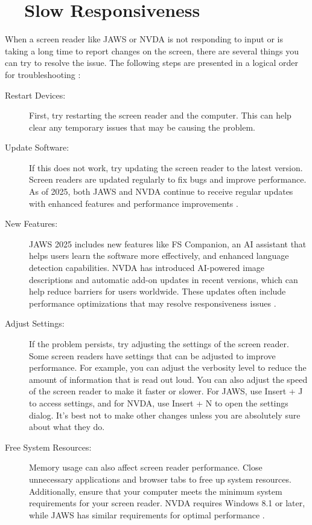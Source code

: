 \section{~~Slow Responsiveness}
\label{app1:response}
When a screen reader like JAWS or NVDA is not responding to input or is taking a long time to report changes on the screen, there are several things you can try to resolve the issue. The following steps are presented in a logical order for troubleshooting \cite{Fowler2011ScreenReaderLatency, Smith2022}:

\begin{description}
	\item[Restart Devices:] First, try restarting the screen reader and the computer. This can help clear any temporary issues that may be causing the problem.
	\item[Update Software:] If this does not work, try updating the screen reader to the latest version. Screen readers are updated regularly to fix bugs and improve performance. As of 2025, both JAWS and NVDA continue to receive regular updates with enhanced features and performance improvements \cite{JAWSWhatsNew, turn0search9}.
	\item[New Features:] JAWS 2025 includes new features like FS Companion, an AI assistant that helps users learn the software more effectively, and enhanced language detection capabilities. NVDA has introduced AI-powered image descriptions and automatic add-on updates in recent versions, which can help reduce barriers for users worldwide. These updates often include performance optimizations that may resolve responsiveness issues \cite{JAWSAILabeler, NarratorImageDescriptions}.
	\item[Adjust Settings:] If the problem persists, try adjusting the settings of the screen reader. Some screen readers have settings that can be adjusted to improve performance. For example, you can adjust the verbosity level to reduce the amount of information that is read out loud. You can also adjust the speed of the screen reader to make it faster or slower. For JAWS, use Insert + J to access settings, and for NVDA, use Insert + N to open the settings dialog. It's best not to make other changes unless you are absolutely sure about what they do.
	\item[Free System Resources:] Memory usage can also affect screen reader performance. Close unnecessary applications and browser tabs to free up system resources. Additionally, ensure that your computer meets the minimum system requirements for your screen reader. NVDA requires Windows 8.1 or later, while JAWS has similar requirements for optimal performance \cite{NVDARequirements, JAWSRequirements}.

\end{description}
